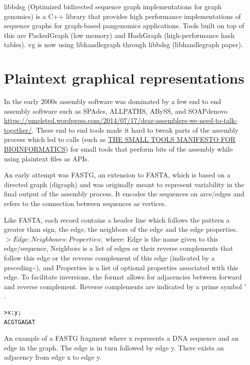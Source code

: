 \documentclass[11pt]{article}
\begin{document}
libbdsg (Optimized bidirected sequence graph implementations for graph genomics)
is a C++ library that provides high performance implementations of sequence 
graphs for graph-based pangenomics applications. Tools built on top of this are
PackedGraph (low memory) and HashGraph (high-performance hash tables).
vg is now using libhandlegraph through libbdsg (libhandlegraph paper).

\section{Plaintext graphical representations}
\label{sec:orgb01d18b}
In the early 2000s assembly software was dominated by a few end to end assembly
software such as SPAdes, ALLPATHS, ABySS, and SOAPdenovo
\url{https://pmelsted.wordpress.com/2014/07/17/dear-assemblers-we-need-to-talk-together/}.
These end to end tools made it hard to tweak parts of the assembly process which
led to calls (such as \href{https://github.com/pjotrp/bioinformatics\#the-small-tools-manifesto-for-bioinformatics}{THE SMALL TOOLS MANIFESTO FOR BIOINFORMATICS}) for small
tools that perform bits of the assembly while using plaintext files as APIs.

An early attempt was FASTG,  an extension to FASTA, which is based on a directed
graph (digraph) and was originally meant to represent variability in the final
output of the assembly process.
It encodes the sequences on arcs/edges and refers to the connection
between sequences as vertices.

Like FASTA, each record contains a header line which follows the pattern
a greater than sign, the edge, the neighbors of the edge and the edge properties.
\(>Edge:Neighbours:Properties;\) where: Edge is the name given to this 
edge/sequence, Neighbors is a list of edges or their reverse complements that
follow this edge or the reverse complement of this edge
(indicated by a preceding\textasciitilde{}), and Properties is a list of optional properties 
associated with this edge. To facilitate
inversions, the format allows for adjacencies between forward and reverse
complement. Reverse complements are indicated by a prime symbol \('\)
.


\begin{verbatim}
>x:y;
ACGTGAGAT
\end{verbatim}
An example of a FASTG fragment where x represents
a DNA sequence and an edge in the graph. The edge is in turn followed by edge y. 
There exists an adjacency from edge x to edge y.
\end{document}
